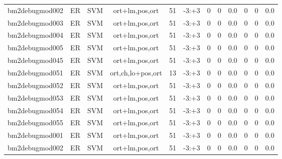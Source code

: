 \documentclass[a4paper]{article}
\begin{document}
\begin{landscape}
\begin{center}
\begin{tabular}{ |c|c|c|c|c|c|c|c|c|c|c|c|}
 
 	
 	\small{ bm2debugmod002 } & ER & SVM & ort+lm,pos,ort  &  51 &  -3:+3  &  0 & 0 & 0.0  &  0 & 0 & 0.0 \\
 	

 
 	
 	\small{ bm2debugmod003 } & ER & SVM & ort+lm,pos,ort  &  51 &  -3:+3  &  0 & 0 & 0.0  &  0 & 0 & 0.0 \\
 	

 
 	
 	\small{ bm2debugmod004 } & ER & SVM & ort+lm,pos,ort  &  51 &  -3:+3  &  0 & 0 & 0.0  &  0 & 0 & 0.0 \\
 	

 
 	
 	\small{ bm2debugmod005 } & ER & SVM & ort+lm,pos,ort  &  51 &  -3:+3  &  0 & 0 & 0.0  &  0 & 0 & 0.0 \\
 	

 
 	
 	\small{ bm2debugmod045 } & ER & SVM & ort+lm,pos,ort  &  51 &  -3:+3  &  0 & 0 & 0.0  &  0 & 0 & 0.0 \\
 	

 
 	
 	\small{ bm2debugmod051 } & ER & SVM & ort,ch,lo+pos,ort  &  13 &  -3:+3  &  0 & 0 & 0.0  &  0 & 0 & 0.0 \\
 	

 
 	
 	\small{ bm2debugmod052 } & ER & SVM & ort+lm,pos,ort  &  51 &  -3:+3  &  0 & 0 & 0.0  &  0 & 0 & 0.0 \\
 	

 
 	
 	\small{ bm2debugmod053 } & ER & SVM & ort+lm,pos,ort  &  51 &  -3:+3  &  0 & 0 & 0.0  &  0 & 0 & 0.0 \\
 	

 
 	
 	\small{ bm2debugmod054 } & ER & SVM & ort+lm,pos,ort  &  51 &  -3:+3  &  0 & 0 & 0.0  &  0 & 0 & 0.0 \\
 	

 
 	
 	\small{ bm2debugmod055 } & ER & SVM & ort+lm,pos,ort  &  51 &  -3:+3  &  0 & 0 & 0.0  &  0 & 0 & 0.0 \\
 	

 
 	
 	\small{ bm2debugmod001 } & ER & SVM & ort+lm,pos,ort  &  51 &  -3:+3  &  0 & 0 & 0.0  &  0 & 0 & 0.0 \\
 	

 
 	
 	\small{ bm2debugmod002 } & ER & SVM & ort+lm,pos,ort  &  51 &  -3:+3  &  0 & 0 & 0.0  &  0 & 0 & 0.0 \\
 	


\end{tabular}
\end{center}
\end{landscape}
\end{document}

